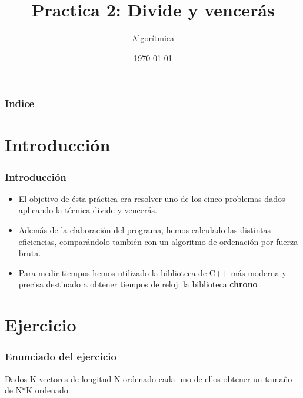 \documentclass{beamer}
\title[Practica 1]{Practica 2: Divide y vencerás} %
\author{Algorítmica} %
\institute[UGR] %
{
Universidad de Granada \\ %
\medskip

}
\date{\today} %
\begin{document}
\begin{frame}
\titlepage %
\end{frame}

\begin{frame}
\frametitle{Indice} %
\tableofcontents %
\end{frame}


\section{Introducción }
\begin{frame}
	\frametitle{Introducción}
	\begin{itemize}
		\item El objetivo de ésta práctica era resolver uno de los cinco problemas dados aplicando la técnica divide y vencerás.
		\item Además de la elaboración del programa, hemos calculado las distintas eficiencias, comparándolo también con un algoritmo de ordenación por fuerza bruta.
		\item Para medir tiempos hemos utilizado la biblioteca de C++ más moderna y precisa destinado a obtener tiempos de reloj: la biblioteca \textbf{chrono}
	
	\end{itemize}
\end{frame}


\section{Ejercicio} %
\begin{frame}
	\frametitle{Enunciado del ejercicio}
	Dados K vectores de longitud N ordenado cada uno de ellos obtener un tamaño de N*K ordenado.
\end{frame}
\end{document}
